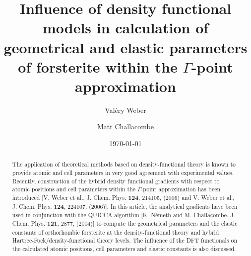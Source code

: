 \documentclass[pra,twocolumn,twocolumngrid,superbib]{revtex4} %
\begin{document}
%
%
%
%
%
\title{ Influence of density functional models in calculation of geometrical and 
        elastic parameters of forsterite within the $\Gamma$-point approximation }

\author{Val\'ery Weber}
\author{Matt Challacombe}%
%

\date{\today}%


\begin{abstract}
The application of theoretical methods based on density-functional 
theory is known to provide atomic and cell parameters in very good 
agreement with experimental values. Recently, construction of the 
hybrid density functional gradients with respect to atomic positions and cell parameters
within the $\Gamma$-point approximation has been introduced 
[V. Weber et al., J. Chem. Phys. {\bf 124}, 214105, (2006) and 
 V. Weber et al., J. Chem. Phys. {\bf 124}, 224107, (2006)]. 
In this article, the analytical gradients have been used in conjunction with the
QUICCA algorithm [K. N\'emeth and M. Challacombe, J. Chem. Phys. {\bf 121}, 2877, (2004)]
to compute the geometrical parameters and the elastic constants of orthorhombic forsterite 
at the density-functional theory and hybrid Hartree-Fock/density-functional theory levels. 
The influence of the DFT functionals on the calculated atomic positions, cell parameters and
elastic constants is also discussed.
\end{abstract}
\end{document}
